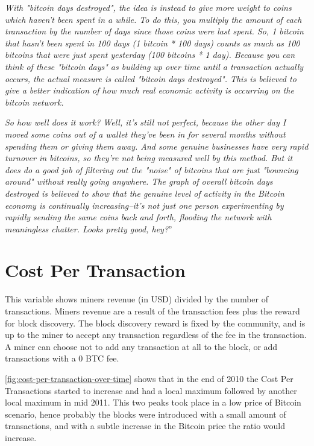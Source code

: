 \textit{With "bitcoin days destroyed", the idea is instead to give
  more weight to coins which haven't been spent in a while. To do
  this, you multiply the amount of each transaction by the number of
  days since those coins were last spent. So, 1 bitcoin that hasn't
  been spent in 100 days (1 bitcoin * 100 days) counts as much as 100
  bitcoins that were just spent yesterday (100 bitcoins * 1 day).
  Because you can think of these "bitcoin days" as building up over
  time until a transaction actually occurs, the actual measure is
  called "bitcoin days destroyed". This is believed to give a better
  indication of how much real economic activity is occurring on the
  bitcoin network.}

\textit{ So how well does it work? Well, it's still not perfect,
  because the other day I moved some coins out of a wallet they've
  been in for several months without spending them or giving them
  away. And some genuine businesses have very rapid turnover in
  bitcoins, so they're not being measured well by this method. But it
  does do a good job of filtering out the "noise" of bitcoins that are
  just "bouncing around" without really going anywhere. The graph of
  overall bitcoin days destroyed is believed to show that the genuine
  level of activity in the Bitcoin economy is continually
  increasing--it's not just one person experimenting by rapidly
  sending the same coins back and forth, flooding the network with
  meaningless chatter. Looks pretty good, hey?}''


\section{Cost Per Transaction}
\label{sec:cost-per-transaction}

This variable shows miners revenue (in USD) divided by the number of
transactions. Miners revenue are a result of the transaction fees plus
the reward for block discovery. The block discovery reward is fixed by
the community, and is up to the miner to accept any transaction
regardless of the fee in the transaction. A miner can choose not to
add any transaction at all to the block, or add transactions with a
$0$ BTC fee.

\autoref{fig:cost-per-transaction-over-time} shows that in the end of
2010 the Cost Per Transactions started to increase and had a local
maximum followed by another local maximum in mid 2011. This two peaks
took place in a low price of Bitcoin scenario, hence probably the
blocks were introduced with a small amount of transactions, and with a
subtle increase in the Bitcoin price the ratio would increase.

